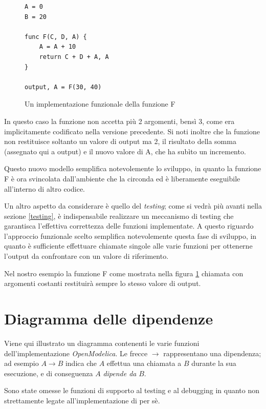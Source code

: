 \documentclass[11pt,a4paper]{report}
\newcommand{\name}[1]{{\ttfamily #1}}
\begin{document}
\begin{figure}[H]
\begin{lstlisting}
A = 0
B = 20

func F(C, D, A) {
	A = A + 10
	return C + D + A, A
}

output, A = F(30, 40)
\end{lstlisting}
\label{implementazione_funzionale_F}
\caption{Un implementazione funzionale della funzione \name{F}}
\end{figure}

In questo caso la funzione non accetta più 2 argomenti, bensì 3, come era implicitamente codificato nella versione precedente. Si noti inoltre che la funzione non restituisce soltanto un valore di output ma 2, il risultato della somma (assegnato qui a \name{output}) e il nuovo valore di \name{A}, che ha subìto un incremento.

Questo nuovo modello semplifica notevolemente lo sviluppo, in quanto la funzione \name{F} è ora svincolata dall'ambiente che la circonda ed è liberamente eseguibile all'interno di altro codice.

Un altro aspetto da considerare è quello del \textit{testing}; come si vedrà più  avanti nella sezione \ref{testing}, è indispensabile realizzare un meccanismo di testing che garantisca l'effettiva correttezza delle funzioni implementate. A questo riguardo l'approccio funzionale scelto semplifica notevolemente questa fase di sviluppo, in quanto è sufficiente effettuare chiamate singole alle varie funzioni per ottenerne l'output da confrontare con un valore di riferimento.

Nel nostro esempio la funzione \name{F} come mostrata nella figura \ref{implementazione_funzionale_F} chiamata con argomenti costanti restituirà sempre lo stesso valore di output.

\section{Diagramma delle dipendenze}

Viene qui illustrato un diagramma contenenti le varie funzioni dell'implementazione \textit{OpenModelica}. Le frecce $\longrightarrow$ rappresentano una dipendenza; ad esempio $A \longrightarrow B$ indica che $A$ effettua una chiamata a $B$ durante la sua esecuzione, e di conseguenza $A$ \textit{dipende da} $B$.

Sono state omesse le funzioni di supporto al testing e al debugging in quanto non strettamente legate all'implementazione di per sè.
\end{document}
